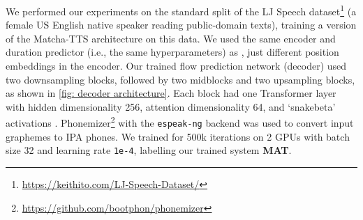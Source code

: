 \documentclass[british]{article}
\newcommand{\customurl}[1]{\url{#1}}
\begin{document}
We performed our experiments on the standard split of the LJ Speech dataset\footnote{\customurl{https://keithito.com/LJ-Speech-Dataset/}} (a female US English native speaker reading public-domain texts), training a version of the Matcha-TTS architecture on this data.
We used the same encoder and duration predictor (i.e., the same hyperparameters) as \cite{popov2021grad}, just different position embeddings in the encoder.
Our trained flow prediction network (decoder) used two downsampling blocks, followed by two midblocks and two upsampling blocks, as shown in \cref{fig: decoder architecture}.
Each block had one Transformer layer with hidden dimensionality 256, attention dimensionality 64, and `snakebeta' activations \cite{lee2023bigvgan}.
Phonemizer\footnote{\customurl{https://github.com/bootphon/phonemizer}} \cite{bernard2021phonemizer} with the \texttt{espeak-ng} backend was used to convert input graphemes to IPA phones.
We trained for 500k iterations on 2 GPUs with batch size 32 and learning rate \texttt{1e-4}, labelling our trained system \textbf{MAT}.
\end{document}
